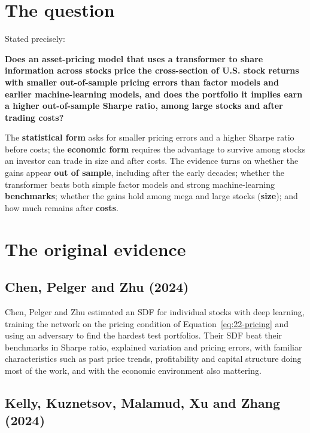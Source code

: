 \section{The question}
\label{sec:22-claim}

Stated precisely:

\begin{callout}
\textbf{Does an asset-pricing model that uses a transformer to share information across stocks price the cross-section of U.S. stock returns with smaller out-of-sample pricing errors than factor models and earlier machine-learning models, and does the portfolio it implies earn a higher out-of-sample Sharpe ratio, among large stocks and after trading costs?}
\end{callout}

The \textbf{statistical form} asks for smaller pricing errors and a higher Sharpe ratio before costs; the \textbf{economic form} requires the advantage to survive among stocks an investor can trade in size and after costs. The evidence turns on whether the gains appear \textbf{out of sample}, including after the early decades; whether the transformer beats both simple factor models and strong machine-learning \textbf{benchmarks}; whether the gains hold among mega and large stocks (\textbf{size}); and how much remains after \textbf{costs}.

\section{The original evidence}
\label{sec:22-evidence}

\subsection{Chen, Pelger and Zhu (2024)}

Chen, Pelger and Zhu estimated an SDF for individual stocks with deep learning, training the network on the pricing condition of Equation~\eqref{eq:22-pricing} and using an adversary to find the hardest test portfolios. Their SDF beat their benchmarks in Sharpe ratio, explained variation and pricing errors, with familiar characteristics such as past price trends, profitability and capital structure doing most of the work, and with the economic environment also mattering.

\subsection{Kelly, Kuznetsov, Malamud, Xu and Zhang (2024)}

